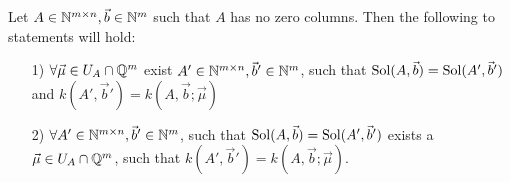 \begin{lemma}
    Let $A \in \mathbb{N}^{m \times n}, \vec b \in \mathbb{N}^m$ such that $A$ has no zero columns. Then the following to statements will hold:
    \begin{enumerate}
        \item[1)] $\forall \vec \mu \in U_A \cap \mathbb{Q}^m$ exist $A' \in \mathbb{N}^{m \times n}, \vec b' \in \mathbb{N}^m$, such that $\operatorname{Sol}(A, \vec b) = \operatorname{Sol}(A', \vec b')$ and
        $k(A', \vec b') = k(A, \vec b; \vec\mu)$
        \item[2)] $\forall  A' \in \mathbb{N}^{m \times n}, \vec b' \in \mathbb{N}^m$, such that $\operatorname{Sol}(A, \vec b) = \operatorname{Sol}(A', \vec b')$ exists a $\vec \mu \in U_A \cap \mathbb{Q}^m$, such that 
        $k(A', \vec b') = k(A, \vec b; \vec\mu)$.
    \end{enumerate}
\end{lemma}
